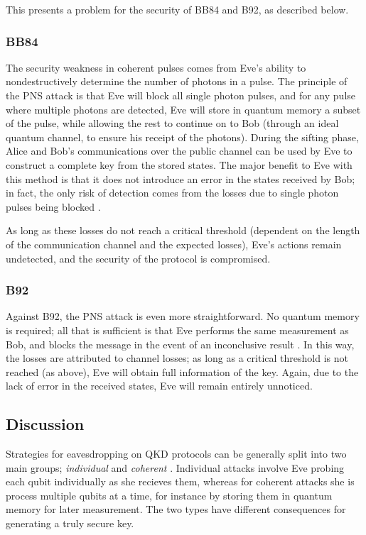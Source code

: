 \documentclass[paper=a4, fontsize=11pt]{scrartcl} %
\numberwithin{equation}{section} %
\numberwithin{figure}{section} %
\numberwithin{table}{section} %
\begin{document}
This presents a problem for the security of BB84 and B92, as described below.

\subsubsection{BB84}
The security weakness in coherent pulses comes from Eve's ability to nondestructively determine the number of photons
in a pulse. The principle of the PNS attack is that Eve will block all single photon pulses, and for any pulse where
multiple photons are detected, Eve will store in quantum memory a subset of the pulse, while allowing the rest to continue
on to Bob (through an ideal quantum channel, to ensure his receipt of the photons). During the sifting
phase, Alice and Bob's communications over the public channel can be used by Eve to construct
a complete key from the stored states. The major benefit to Eve with this method is that it does not introduce an error in the
states received by Bob; in fact, the only risk of detection comes from the losses due to single photon pulses being blocked \citep{kronberg2009}.

As long as these losses do not reach a critical threshold (dependent on the length of the communication channel and the expected losses),
Eve's actions remain undetected, and the security of the protocol is compromised.


\subsubsection{B92}
Against B92, the PNS attack is even more straightforward. No quantum memory is required; all that is sufficient is that Eve performs
the same measurement as Bob, and blocks the message in the event of an inconclusive result \citep{kronberg2009}. In this way, the losses are attributed
to channel losses; as long as a critical threshold is not reached (as above), Eve will obtain full information of the key. Again, due to
the lack of error in the received states, Eve will remain entirely unnoticed.

\subsection{Discussion}
Strategies for eavesdropping on QKD protocols can be generally split into two main groups;
\textit{individual} and \textit{coherent} \citep{gisin2002}. Individual attacks involve
Eve probing each qubit individually as she recieves them, whereas for coherent attacks
she is process multiple qubits at a time, for instance by storing them in quantum
memory for later measurement. The two types have different consequences for generating
a truly secure key.
\end{document}
